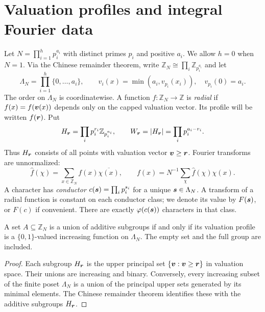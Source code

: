 \section{Valuation profiles and integral Fourier data}
Let $N=\prod_{i=1}^h p_i^{a_i}$ with distinct primes $p_i$ and positive $a_i$.  We allow $h=0$ when $N=1$.  Via the Chinese remainder theorem, write $\mathbb Z_N\cong\prod_i\mathbb Z_{p_i^{a_i}}$ and let
\[
 \Lambda_N=\prod_{i=1}^h\{0,\ldots,a_i\},\qquad
 v_i(x)=\min(a_i,v_{p_i}(x_i)),\quad v_{p_i}(0)=a_i.
\]
The order on $\Lambda_N$ is coordinatewise.  A function $f:\mathbb Z_N\to\mathbb Z$ is \emph{radial} if $f(x)=f(\boldsymbol{v}(x))$ depends only on the capped valuation vector.  Its profile will be written $f(\boldsymbol{r})$.  Put
\[
 H_{\boldsymbol{r}}=\prod_i p_i^{r_i}\mathbb Z_{p_i^{a_i}},\qquad
 W_{\boldsymbol{r}}=|H_{\boldsymbol{r}}|=\prod_i p_i^{a_i-r_i}.
\]
Thus $H_{\boldsymbol{r}}$ consists of all points with valuation vector $\boldsymbol{v}\ge\boldsymbol{r}$.  Fourier transforms are unnormalized:
\[
 \widehat f(\chi)=\sum_{x\in\mathbb Z_N} f(x)\overline{\chi(x)},
 \qquad f(x)=N^{-1}\sum_{\chi}\widehat f(\chi)\chi(x).
\]
A character has \emph{conductor} $c(\boldsymbol{s})=\prod_i p_i^{s_i}$ for a unique $\boldsymbol{s}\in\Lambda_N$.  A transform of a radial function is constant on each conductor class; we denote its value by $F(\boldsymbol{s})$, or $F(c)$ if convenient.  There are exactly $\varphi(c(\boldsymbol{s}))$ characters in that class.

\begin{lemma}\label{ii:lem:upset}
A set $A\subseteq\mathbb Z_N$ is a union of additive subgroups if and only if its valuation profile is a $\{0,1\}$-valued increasing function on $\Lambda_N$.  The empty set and the full group are included.
\end{lemma}
\begin{proof}
Each subgroup $H_{\boldsymbol{r}}$ is the upper principal set $\{\boldsymbol{v}:\boldsymbol{v}\ge\boldsymbol{r}\}$ in valuation space.  Their unions are increasing and binary.  Conversely, every increasing subset of the finite poset $\Lambda_N$ is a union of the principal upper sets generated by its minimal elements.  The Chinese remainder theorem identifies these with the additive subgroups $H_{\boldsymbol{r}}$.\qedhere
\end{proof}

